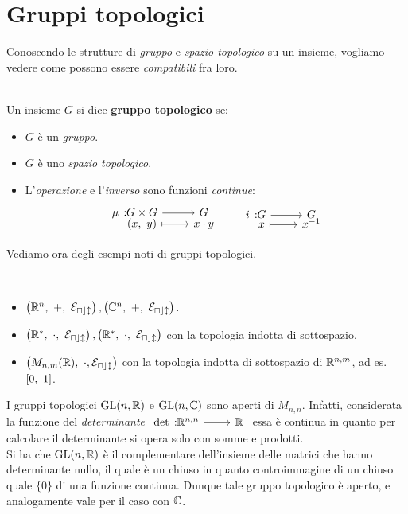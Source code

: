 \section{Gruppi topologici}
Conoscendo le strutture di \textit{gruppo} e \textit{spazio topologico} su un insieme, vogliamo vedere come possono essere \textit{compatibili} fra loro.
\begin{define}~{}\\
	Un insieme $G$ si dice \textbf{gruppo topologico} se:
		\begin{itemize}
			\item $G$ è un \textit{gruppo}.
			\item $G$ è uno \textit{spazio topologico}.
			\item L'\textit{operazione} e l'\textit{inverso} sono funzioni \textit{continue}:
			\begin{equation}
				\funztot \mu {G\times G} G {(x,\ y)} {x\cdot y}\qquad \funztot i G G x {x^{-1}}
			\end{equation}
		\end{itemize}
	\vspace{-3mm}
\end{define}
Vediamo ora degli esempi noti di gruppi topologici.
\begin{examples}~{}
	\begin{itemize}
		\item $\left( \realset^n, \ +, \ \mathcal{E_{ucl}} \right), \left( \complexset ^n, \ +, \ \mathcal{E_{ucl}} \right)$.
		\item $\left( \realset^*, \ \cdot,\ \mathcal{E_{ucl}} \right), \left( \realset^*, \ \cdot, \ \mathcal{E_{ucl}} \right)$ con la topologia indotta di sottospazio.
		\item $\left( M_{n,m}(\mathbb{R}),\ \cdot, \mathcal{E_{ucl}} \right)$ con la topologia indotta di sottospazio di $\mathbb{R}^{n,m}$, ad es. $\left[0,\ 1\right]$.
	\end{itemize}
\vspace{-3mm}
\end{examples}
\begin{observe}
	I gruppi topologici $\operatorname{GL} (n,\mathbb{R} )$ e $\operatorname{GL} (n, \mathbb{C} )$ sono aperti di $M_{n,n}$.\newline
	Infatti, considerata la funzione del \textit{determinante} $\funz \det {\realset^{n,n}} \realset$ essa è continua in quanto per calcolare il determinante si opera solo con somme e prodotti.\\
	Si ha che $\operatorname{GL}(n, \mathbb{R})$ è il complementare dell'insieme delle matrici che hanno determinante nullo, il quale è un chiuso in quanto controimmagine di un chiuso quale $\{0\}$ di una funzione continua. Dunque tale gruppo topologico è aperto, e analogamente vale per il caso con $\mathbb{C}$.
\end{observe}
